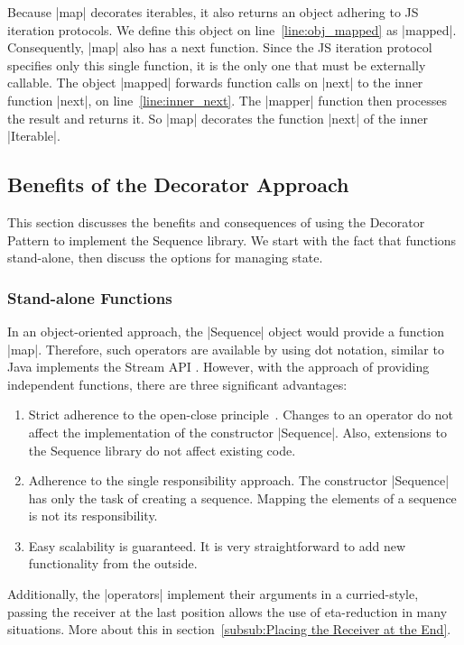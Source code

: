 Because |map| decorates iterables, it also returns an object adhering to JS
iteration protocols. We define this object on line~\ref{line:obj_mapped} as
|mapped|. Consequently, |map| also has a next function. Since the JS iteration
protocol specifies only this single function, it is the only one that must be
externally callable. The object |mapped| forwards function calls on |next| to
the inner function |next|, on line~\ref{line:inner_next}. The |mapper| function
then processes the result and returns it. So |map| decorates the function
|next| of the inner |Iterable|.

\subsection{Benefits of the Decorator Approach}
\label{sub:Benefits of the Decorator Approach}
This section discusses the benefits and consequences of using the Decorator 
Pattern to implement the Sequence library. We start with the fact that functions 
stand-alone, then discuss the options for managing state.

\subsubsection{Stand-alone Functions}
\label{subsub:Standalone Functions}
In an object-oriented approach, the |Sequence| object would provide a function
|map|. Therefore, such operators are available by using dot notation,
similar to Java implements the Stream API \cite{java_stream}. 
However, with the approach of providing independent functions, there 
are three significant advantages:

\begin{enumerate}
  \item {Strict adherence to the open-close
      principle~\cite[p.~3]{eilebrecht_patterns_2019}. Changes to an operator
      do not affect the implementation of the constructor |Sequence|. Also,
      extensions to the Sequence library do not affect existing code.
    }
  \item{Adherence to the single responsibility approach. The constructor
    |Sequence| has only the task of creating a sequence. Mapping the elements
  of a sequence is not its responsibility. }
  \item{Easy scalability is guaranteed. It is very straightforward to add new
    functionality from the outside. }
\end{enumerate}

Additionally, the |operators| implement their arguments in a curried-style, passing the
receiver at the last position allows the use of eta-reduction in many situations. 
More about this in section~\ref{subsub:Placing the Receiver at the End}.

